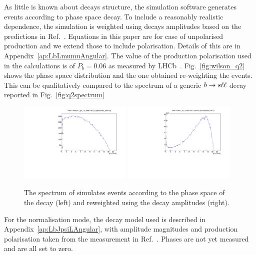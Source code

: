 As little is known about \Lb decays structure, the simulation software generates events
according to phase space decay. To include a reasonably realistic \qsq dependence,
the simulation is weighted using decays amplitudes based on the predictions in Ref.~\cite{Gutsche:2013pp}.
Equations in this paper are for case of unpolarised production and we extend those to include polarisation.
Details of this are in Appendix~\ref{ap:LbLmumuAngular}. The value of the \Lb production polarisation 
used in the calculations is of $P_b = 0.06$ as measured by LHCb~\cite{Aaij:2013oxa}. 
Fig.~\ref{fig:wilson_q2} shows the phase space \qsq distribution and the one obtained re-weighting the events.
This can be qualitatively compared to the \qsq spectrum of a generic $b\rightarrow s\ell\ell$ decay
reported in Fig.~\ref{fig:q2spectrum}
%
\begin{figure}
\centering
\includegraphics[width=0.48\textwidth]{Lmumu/figs/Q2_beforemodel.pdf}
\includegraphics[width=0.48\textwidth]{Lmumu/figs/Q2_aftermodel.pdf}
\caption{The \qsq spectrum of \Lb\to\Lz\mumu simulates events according to the
phase space of the decay (left) and reweighted using the decay amplitudes (right).}
\label{fig:decaymodeleffonq2}
\end{figure}
%
For the normalisation mode, the decay model used is described in Appendix~\ref{ap:LbJpsiLAngular},
with amplitude magnitudes and production polarisation taken from the measurement in
Ref.~\cite{Aaij:2013oxa}. Phases are not yet measured and are all set to zero.


